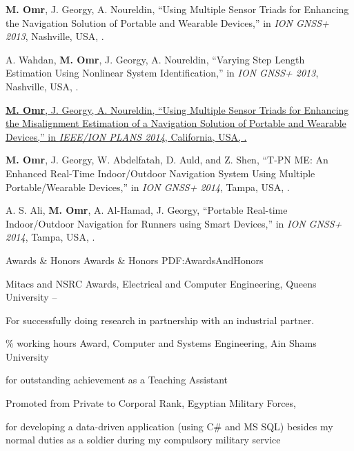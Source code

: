 \documentclass[letterpaper,MMMyyyy,nonstopmode]{simpleresumecv}
\newcommand{\CVNote}{CV compiled on {\today} for Udacity 2018}
\begin{document}
\begin{Body}
\Gap
\NumberedItem{[1]}
{\textbf{M. Omr}, J. Georgy, A. Noureldin,
``Using Multiple Sensor Triads for Enhancing the Navigation Solution of Portable and Wearable Devices,''
in \textit{ION GNSS+ 2013},
Nashville, USA,
.}

\Gap
\NumberedItem{[2]}
{A. Wahdan, \textbf{M. Omr}, J. Georgy, A. Noureldin,
``Varying Step Length Estimation Using Nonlinear System Identification,''
in \textit{ION GNSS+ 2013},
Nashville, USA,
.}

\Gap
\NumberedItem{[3]}
\href{https://doi.org/10.1109/PLANS.2014.6851485}
{\textbf{M. Omr}, J. Georgy, A. Noureldin,
``Using Multiple Sensor Triads for Enhancing the Misalignment Estimation of a Navigation Solution of Portable and Wearable Devices,''
in \textit{IEEE/ION PLANS 2014},
California, USA,
.}

\Gap
\NumberedItem{[4]}
{\textbf{M. Omr}, J. Georgy, W. Abdelfatah, D. Auld, and Z. Shen,
``T-PN ME: An Enhanced Real-Time Indoor/Outdoor Navigation System Using Multiple Portable/Wearable Devices,''
in \textit{ION GNSS+ 2014},
Tampa, USA,
.}

\Gap
\NumberedItem{[5]}
{A. S. Ali, \textbf{M. Omr}, A. Al-Hamad, J. Georgy,
``Portable Real-time Indoor/Outdoor Navigation for Runners using Smart Devices,''
in \textit{ION GNSS+ 2014},
Tampa, USA,
.}

\endgroup


\Section
{Awards \&\newline
Honors}
{Awards \& Honors}
{PDF:AwardsAndHonors}

\BulletItem
Mitacs and NSRC Awards, Electrical and Computer Engineering, Queens University 
\hfill
{} --
\begin{Detail}
\Item
For successfully doing research in partnership with an industrial partner.
\end{Detail}

\Gap
{}\% working hours Award, Computer and Systems Engineering, Ain Shams University
\hfill
{}
\begin{Detail}
\Item
for outstanding achievement as a Teaching Assistant
\end{Detail}

\Gap
\BulletItem
Promoted from Private to Corporal Rank, Egyptian Military Forces, 
\hfill
{}
\begin{Detail}
\Item
for developing a data-driven application (using C\# and MS SQL) besides my normal duties as a soldier\newline
during my compulsory military service
\end{Detail}


\end{Body}


\end{document}
